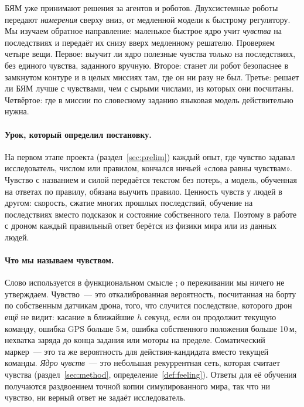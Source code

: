 \documentclass[10pt]{article}
\begin{document}
БЯМ уже принимают решения за агентов и роботов. Двухсистемные роботы \citep{lin2023swiftsage,gr00t2025,helix2025} передают
\emph{намерения} сверху вниз, от медленной модели к быстрому регулятору. Мы изучаем обратное направление: маленькое быстрое ядро
учит \emph{чувства} на последствиях и передаёт их снизу вверх медленному решателю. Проверяем четыре вещи. Первое: выучит ли ядро
полезные чувства только на последствиях, без единого чувства, заданного вручную. Второе: станет ли робот безопаснее в замкнутом
контуре и в целых миссиях там, где он ни разу не был. Третье: решает ли БЯМ лучше с чувствами, чем с сырыми числами, из
которых они посчитаны. Четвёртое: где в миссии по словесному заданию языковая модель действительно нужна.

\paragraph{Урок, который определил постановку.} На первом этапе проекта (раздел~\ref{sec:prelim}) каждый опыт, где чувство
задавал исследователь, числом или правилом, кончался ничьей «слова равны чувствам». Чувство с названием и силой передаётся
текстом без потерь, а модель, обученная на ответах по правилу, обязана выучить правило. Ценность чувств у людей в другом:
скорость, сжатие многих прошлых последствий, обучение на последствиях вместо подсказок и состояние собственного тела. Поэтому в
работе с дроном каждый правильный ответ берётся из физики мира или из данных людей.

\paragraph{Что мы называем чувством.} Слово используется в функциональном смысле \citet{man2019}; о переживании мы ничего не утверждаем. Чувство~--- это откалиброванная вероятность, посчитанная на борту по собственным датчикам дрона, того, что случится последствие, которого дрон ещё не видит: касание в ближайшие $h$ секунд, если он продолжит текущую команду, ошибка GPS больше 5\,м, ошибка собственного положения больше 10\,м, нехватка заряда до конца задания или моторы на пределе. Соматический маркер~--- это та же вероятность для действия-кандидата вместо текущей команды. \emph{Ядро чувств}~--- это небольшая рекуррентная сеть, которая считает чувства (раздел~\ref{sec:method}, определение~\ref{def:feeling}). Ответы для её обучения получаются раздвоением точной копии симулированного мира, так что ни чувство, ни верный ответ не задаёт исследователь.
\end{document}
